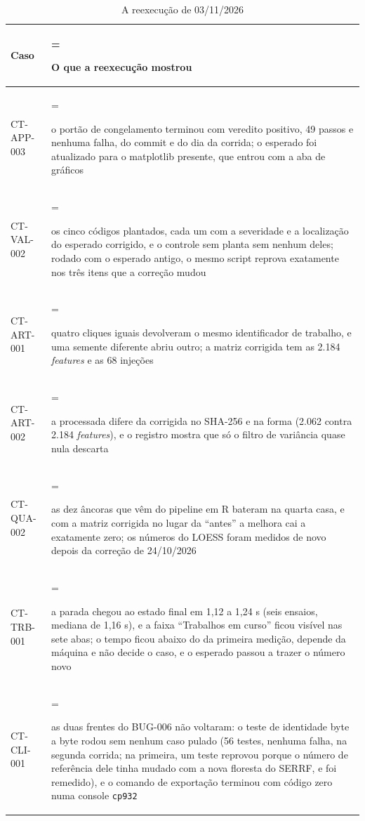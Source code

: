 \begin{table}[htbp]
\centering
\caption{A reexecução de 03/11/2026}\label{tab:5-3a}
\normalsize
\begin{tabularx}{\linewidth}{|l|>{\hsize=1\hsize\linewidth=\hsize\raggedright\arraybackslash\hspace{0pt}}X|}
\hline
\textbf{Caso} & \textbf{O que a reexecução mostrou} \\
\hline
CT-APP-003 & o portão de congelamento terminou com veredito positivo, 49 passos e nenhuma falha, do commit e do dia da corrida; o esperado foi atualizado para o matplotlib presente, que entrou com a aba de gráficos \\ \hline
CT-VAL-002 & os cinco códigos plantados, cada um com a severidade e a localização do esperado corrigido, e o controle sem planta sem nenhum deles; rodado com o esperado antigo, o mesmo script reprova exatamente nos três itens que a correção mudou \\ \hline
CT-ART-001 & quatro cliques iguais devolveram o mesmo identificador de trabalho, e uma semente diferente abriu outro; a matriz corrigida tem as 2.184 \textit{features} e as 68 injeções \\ \hline
CT-ART-002 & a processada difere da corrigida no SHA-256 e na forma (2.062 contra 2.184 \textit{features}), e o registro mostra que só o filtro de variância quase nula descarta \\ \hline
CT-QUA-002 & as dez âncoras que vêm do pipeline em R bateram na quarta casa, e com a matriz corrigida no lugar da ``antes'' a melhora cai a exatamente zero; os números do LOESS foram medidos de novo depois da correção de 24/10/2026 \\ \hline
CT-TRB-001 & a parada chegou ao estado final em 1,12 a 1,24 s (seis ensaios, mediana de 1,16 s), e a faixa ``Trabalhos em curso'' ficou visível nas sete abas; o tempo ficou abaixo do da primeira medição, depende da máquina e não decide o caso, e o esperado passou a trazer o número novo \\ \hline
CT-CLI-001 & as duas frentes do BUG-006 não voltaram: o teste de identidade byte a byte rodou sem nenhum caso pulado (56 testes, nenhuma falha, na segunda corrida; na primeira, um teste reprovou porque o número de referência dele tinha mudado com a nova floresta do SERRF, e foi remedido), e o comando de exportação terminou com código zero numa console \texttt{cp932} \\ \hline
\end{tabularx}
\end{table}

